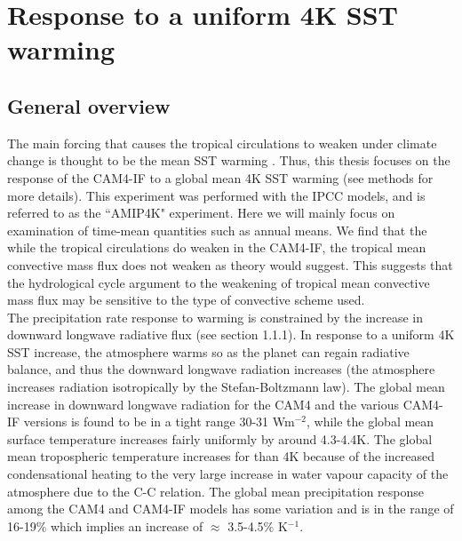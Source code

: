 \documentclass[letterpaper,12pt,titlepage,oneside,final]{book}
\begin{document}
\section{Response to a uniform 4K SST warming}

\subsection{General overview}

The main forcing that causes the tropical circulations to weaken under climate change is thought to be the mean SST warming \cite{he_anthropogenic_2015}. Thus, this thesis focuses on the response of the CAM4-IF to a global mean 4K SST warming (see methods for more details). This experiment was performed with the IPCC models, and is referred to as the ``AMIP4K" experiment. Here we will mainly focus on examination of time-mean quantities such as annual means. We find that the while the tropical circulations do weaken in the CAM4-IF, the tropical mean convective mass flux does not weaken as theory would suggest. This suggests that the hydrological cycle argument to the weakening of tropical mean convective mass flux may be sensitive to the type of convective scheme used.
\\
The precipitation rate response to warming is constrained by the increase in downward longwave radiative flux (see section 1.1.1). In response to a uniform 4K SST increase, the atmosphere warms so as the planet can regain radiative balance, and thus the downward longwave radiation increases (the atmosphere increases radiation isotropically by the Stefan-Boltzmann law). The global mean increase in downward longwave radiation for the CAM4 and the various CAM4-IF versions is found to be in a tight range 30-31 Wm$^{-2}$, while the global mean surface temperature increases fairly uniformly by around 4.3-4.4K. The global mean tropospheric temperature increases for than 4K because of the increased condensational heating to the very large increase in water vapour capacity of the atmosphere due to the C-C relation. The global mean precipitation response among the CAM4 and CAM4-IF models has some variation and is in the range of 16-19\% which implies an increase of $\approx$ 3.5-4.5\% K$^{-1}$.
\\
\end{document}

